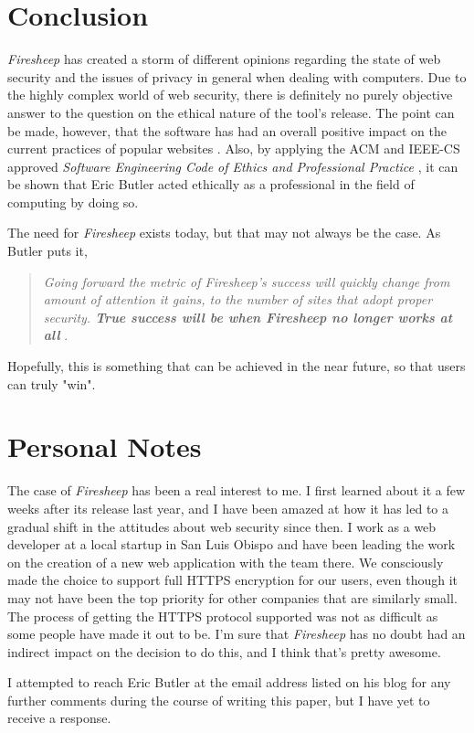 \documentclass[11pt]{article}
\begin{document}
\begin{multicols}{2}
\section{Conclusion}
\emph{Firesheep} has created a storm of different opinions regarding the state of web security and the issues of privacy in general when dealing with computers. Due to the highly complex world of web security, there is definitely no purely objective answer to the question on the ethical nature of the tool's release. The point can be made, however, that the software has had an overall positive impact on the current practices of popular websites \cite{github_reaction} \cite{facebook_reaction} \cite{twitter_reaction}. Also, by applying the ACM and IEEE-CS approved \emph{Software Engineering Code of Ethics and Professional Practice} \cite{se_code}, it can be shown that Eric Butler acted ethically as a professional in the field of computing by doing so.

The need for \emph{Firesheep} exists today, but that may not always be the case. As Butler puts it,

\begin{quote}
  \emph{Going forward the metric of Firesheep’s success will quickly change from amount of attention it gains, to the number of sites that adopt proper security. \textbf{True success will be when Firesheep no longer works at all}} \cite{codebutler_blog_2}.
\end{quote}

Hopefully, this is something that can be achieved in the near future, so that users can truly "win".

\section{Personal Notes}
The case of \emph{Firesheep} has been a real interest to me. I first learned about it a few weeks after its release last year, and I have been amazed at how it has led to a gradual shift in the attitudes about web security since then. I work as a web developer at a local startup in San Luis Obispo and have been leading the work on the creation of a new web application with the team there. We consciously made the choice to support full HTTPS encryption for our users, even though it may not have been the top priority for other companies that are similarly small. The process of getting the HTTPS protocol supported was not as difficult as some people have made it out to be. I'm sure that \emph{Firesheep} has no doubt had an indirect impact on the decision to do this, and I think that's pretty awesome.

I attempted to reach Eric Butler at the email address listed on his blog for any further comments during the course of writing this paper, but I have yet to receive a response.

\end{multicols}
\newpage
\nocite{*}


\end{document}
